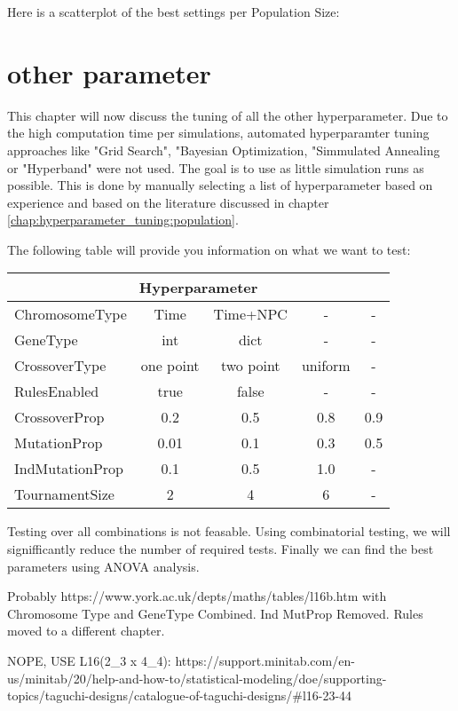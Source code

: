 Here is a scatterplot of the best settings per Population Size:


\section{other parameter}
\label{chap:hyperparameter_tuning:other_parameter}

This chapter will now discuss the tuning of all the other hyperparameter. 
Due to the high computation time per simulations, automated hyperparamter tuning approaches like "Grid Search", "Bayesian Optimization, "Simmulated Annealing or "Hyperband" were not used. 
The goal is to use as little simulation runs as possible. This is done by manually selecting a list of hyperparameter based on experience and based on the literature discussed in chapter \ref{chap:hyperparameter_tuning:population}. 


The following table will provide you information on what we want to test:

\begin{tabular}{ |l||c|c|c|c|  }
	\hline
	\multicolumn{5}{|c|}{ Hyperparameter } \\
	\hline
	ChromosomeType   	& Time & Time+NPC & - & -\\
	GeneType			& int & dict & - & -\\
	CrossoverType 		& one point & two point & uniform & -\\
	RulesEnabled    	& true & false & - & -\\
	CrossoverProp    	& 0.2 & 0.5 & 0.8 & 0.9\\
	MutationProp   		& 0.01 & 0.1 & 0.3 & 0.5\\
	IndMutationProp		& 0.1 & 0.5 & 1.0 & -\\
	TournamentSize 		& 2 & 4 & 6 & -\\
	\hline
\end{tabular}

Testing over all combinations is not feasable. Using combinatorial testing, we will signifficantly reduce the number of required tests. Finally we can find the best parameters using ANOVA analysis.

Probably https://www.york.ac.uk/depts/maths/tables/l16b.htm with Chromosome Type and GeneType Combined. Ind MutProp Removed. Rules moved to a different chapter.

NOPE, USE L16(2_3 x 4_4): https://support.minitab.com/en-us/minitab/20/help-and-how-to/statistical-modeling/doe/supporting-topics/taguchi-designs/catalogue-of-taguchi-designs/#l16-23-44

